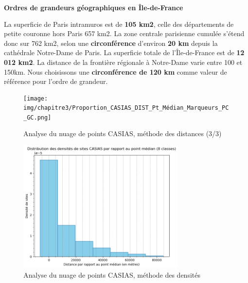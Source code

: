 \documentclass[a4paper,twoside,12pt]{book}
\begin{document}
\begin{tcolorbox}[colback=gray!5!white,colframe=gray!20!white]
\textbf{Ordres de grandeurs géographiques en Île-de-France}

La superficie de Paris intramuros est de \textbf{105 km2}, celle des départements de petite couronne hors Paris 657 km2. La zone centrale parisienne cumulée s'étend donc sur 762 km2, selon une \textbf{circonférence} d'environ \textbf{20 km} depuis la cathédrale Notre-Dame de Paris. La superficie totale de l'Île-de-France est de \textbf{12 012 km2}. La distance de la frontière régionale à Notre-Dame varie entre 100 et 150km. Nous choisissons une \textbf{circonférence de 120 km} comme valeur de référence pour l'ordre de grandeur. 
\end{tcolorbox} 

 \begin{figure}[!h] 
\centering  
\texttt{[image: img/chapitre3/Proportion\_CASIAS\_DIST\_Pt\_Médian\_Marqueurs\_PC\_GC.png]} 
\caption{Analyse du nuage de points CASIAS, méthode des distances (3/3)} 
\label{fig:dist_casias_pointmedian_3} 
\end{figure}

 \begin{figure}[!h] 
\centering  
\includegraphics[width=0.75\textwidth]{img/chapitre3/CASIAS_DENSITE_DISTRIBUTION_SITES.png} 
\caption{Analyse du nuage de points CASIAS, méthode des densités} 
\label{fig:casias_densites_points} 
\end{figure}
\end{document}
